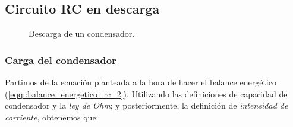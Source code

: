 \documentclass[../main.tex]{subfiles}
\begin{document}
\subsection{Circuito RC en descarga}
\begin{figure}[!h]
    \centering
    \caption{Descarga de un condensador.}
    \label{fig::descarga_condensador_2}
\end{figure}


\subsubsection{Carga del condensador}

\label{part::descarga_condensador_1}
Partimos de la ecuación planteada a la hora de hacer el balance energético (\ref{eqq::balance_energetico_rc_2}). Utilizando las definiciones de capacidad de condensador y la \textit{ley de Ohm}; y posteriormente, la definición de \textit{intensidad de corriente}, obtenemos que:
\end{document}
